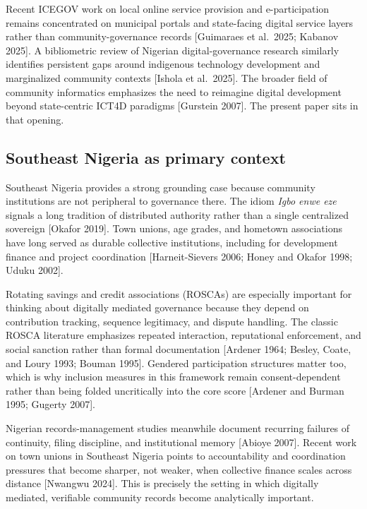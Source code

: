 \documentclass[sigconf,anonymous]{acmart}
\begin{document}
Recent ICEGOV work on local online service provision and e-participation remains concentrated on municipal portals and state-facing digital service layers rather than community-governance records [Guimaraes et al.\ 2025; Kabanov 2025]. A bibliometric review of Nigerian digital-governance research similarly identifies persistent gaps around indigenous technology development and marginalized community contexts [Ishola et al.\ 2025]. The broader field of community informatics emphasizes the need to reimagine digital development beyond state-centric ICT4D paradigms [Gurstein 2007]. The present paper sits in that opening.

\subsection{Southeast Nigeria as primary context}

Southeast Nigeria provides a strong grounding case because community institutions are not peripheral to governance there. The idiom \textit{Igbo enwe eze} signals a long tradition of distributed authority rather than a single centralized sovereign [Okafor 2019]. Town unions, age grades, and hometown associations have long served as durable collective institutions, including for development finance and project coordination [Harneit-Sievers 2006; Honey and Okafor 1998; Uduku 2002].

Rotating savings and credit associations (ROSCAs) are especially important for thinking about digitally mediated governance because they depend on contribution tracking, sequence legitimacy, and dispute handling. The classic ROSCA literature emphasizes repeated interaction, reputational enforcement, and social sanction rather than formal documentation [Ardener 1964; Besley, Coate, and Loury 1993; Bouman 1995]. Gendered participation structures matter too, which is why inclusion measures in this framework remain consent-dependent rather than being folded uncritically into the core score [Ardener and Burman 1995; Gugerty 2007].

Nigerian records-management studies meanwhile document recurring failures of continuity, filing discipline, and institutional memory [Abioye 2007]. Recent work on town unions in Southeast Nigeria points to accountability and coordination pressures that become sharper, not weaker, when collective finance scales across distance [Nwangwu 2024]. This is precisely the setting in which digitally mediated, verifiable community records become analytically important.
\end{document}
